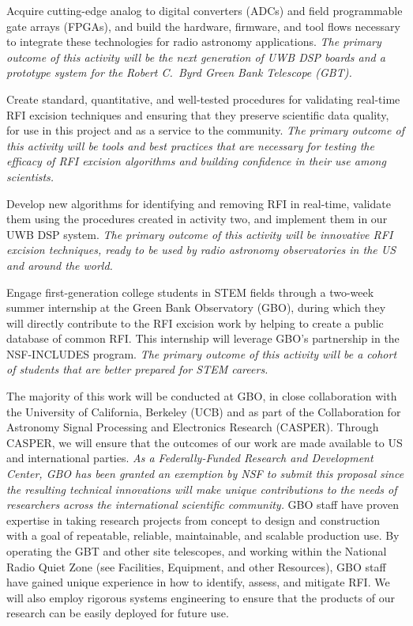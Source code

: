 \documentclass[10pt]{myNSF}
\begin{document}
\begin{enumerate*}
\item{Acquire cutting-edge analog to digital converters (ADCs) and
  field programmable gate arrays (\mbox{FPGAs}), and build the
  hardware, firmware, and tool flows necessary to integrate these
  technologies for radio astronomy applications.  \emph{The primary
    outcome of this activity will be the next generation of UWB DSP
    boards and a prototype system for the Robert C.\ Byrd Green Bank
    Telescope (GBT).}}
\item{Create standard, quantitative, and well-tested procedures for
  validating real-time RFI excision techniques and ensuring that they
  preserve scientific data quality, for use in this project and as a
  service to the community. \emph{The primary outcome of this activity
    will be tools and best practices that are necessary for testing
    the efficacy of RFI excision algorithms and building confidence in
    their use among scientists.}}
\item{Develop new algorithms for identifying and removing RFI in
  real-time, validate them using the procedures created in activity
  two, and implement them in our UWB DSP system.  \emph{The primary
    outcome of this activity will be innovative RFI excision
    techniques, ready to be used by radio astronomy observatories in
    the US and around the world.}}
\item{Engage first-generation college students in STEM fields through
  a two-week summer internship at the Green Bank Observatory (GBO),
  during which they will directly contribute to the RFI excision work
  by helping to create a public database of common RFI. This
  internship will leverage GBO's partnership in the NSF-INCLUDES
  program.  \emph{The primary outcome of this activity will be a
    cohort of students that are better prepared for STEM careers.}}
\end{enumerate*}
The majority of this work will be conducted at GBO, in close
collaboration with the University of California, Berkeley (UCB) and as
part of the Collaboration for Astronomy Signal Processing and
Electronics Research (CASPER).  Through CASPER, we will ensure that
the outcomes of our work are made available to US and international
parties.  \emph{As a Federally-Funded Research and Development Center,
  GBO has been granted an exemption by NSF to submit this proposal
  since the resulting technical innovations will make unique
  contributions to the needs of researchers across the international
  scientific community.}  GBO staff have proven expertise in taking
research projects from concept to design and construction with a goal
of repeatable, reliable, maintainable, and scalable production use.
By operating the GBT and other site telescopes, and working within the
National Radio Quiet Zone (see Facilities, Equipment, and other
Resources), GBO staff have gained unique experience in how to
identify, assess, and mitigate RFI.  We will also employ rigorous
systems engineering to ensure that the products of our research can be
easily deployed for future use.
\end{document}

